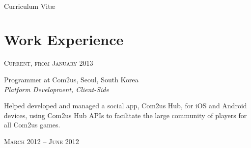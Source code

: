 \documentclass[10pt]{article} %
\begin{document}
\color{textcolor} %


\par{\\ %
{\color{headings} Curriculum {Vit\ae}\\[15pt]\par} %
	

\begin{minipage}[t]{0.5\textwidth} %
\vspace{0pt} %
	

\section{Work Experience} 


{\raggedleft\textsc{Current, from January 2013}\par}

{\raggedright\large Programmer at Com2us, Seoul, South Korea\\
\textit{Platform Development, Client-Side}\\[5pt]}

\normalsize{Helped developed and managed a social app, Com2us Hub, for iOS and Android devices, using Com2us Hub APIs to facilitate the large community of players for all Com2us games.}\\


{\raggedleft\textsc{March 2012 -- June 2012}\par}


\end{minipage}}
\end{document}

